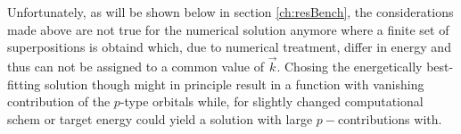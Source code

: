 Unfortunately, as will be shown below in section \ref{ch:resBench}, the considerations made above are not true for the numerical solution anymore where a finite set of superpositions is obtaind which, due to numerical treatment, differ in energy and thus can not be assigned to a common value of $\vec{k}$.
Chosing the energetically best-fitting solution though might in principle result in a function with vanishing contribution of the $p$-type orbitals while, for slightly changed computational schem or target energy could yield a solution with large $p-$contributions with.

%

